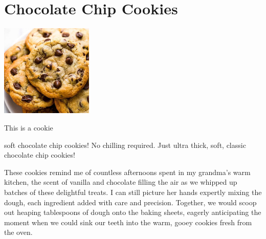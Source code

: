 \chapter{Chocolate Chip Cookies}
\label{ch:extra-choco-chip-cookies}



\begin{marginfigure}[20pt]
  \includegraphics[width=44mm]{extra/images/BAKERY-STYLE-CHOCOLATE-CHIP-COOKIES-9-637x637-1.jpg}
  \caption{This is a cookie}
  \label{fig:marginfig}
\end{marginfigure}


 soft chocolate chip cookies! No chilling required. Just ultra thick, soft, classic chocolate chip cookies!

These cookies remind me of countless afternoons spent in my grandma's warm kitchen, the scent of vanilla and chocolate filling the air as we whipped up batches of these delightful treats. I can still picture her hands expertly mixing the dough, each ingredient added with care and precision. Together, we would scoop out heaping tablespoons of dough onto the baking sheets, eagerly anticipating the moment when we could sink our teeth into the warm, gooey cookies fresh from the oven.

